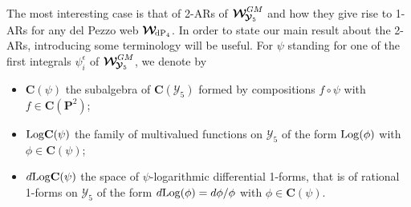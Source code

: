\documentclass[11pt]{amsart}
\newcommand{\sk}{\smallskip}
\begin{document}
The most interesting case is that of 2-ARs of $\boldsymbol{\mathcal W}^{GM}_{ \hspace{-0.05cm}
\boldsymbol{\mathcal Y}_5}$ and how they give rise to 1-ARs for any del Pezzo web 
$\boldsymbol{\mathcal W}_{  \hspace{-0.05cm}{\rm dP}_4}$. 
In order to state our main result about the 2-ARs, introducing some terminology will be useful. For  $\psi$ standing for one of the first integrals  
$\psi_i^\epsilon$ of $ \boldsymbol{\mathcal W}^{GM}_{ \hspace{-0.05cm}
\boldsymbol{\mathcal Y}_5}$, we denote by 
\begin{itemize}
\item 
$\mathbf C(\psi)$ the subalgebra of 
$\mathbf C(\boldsymbol{\mathcal Y}_5)$ formed by compositions $f\circ \psi$ with $f \in\mathbf C( \mathbf P^2)$;\sk
\item ${\rm Log}\mathbf C(\psi)$ the family of multivalued functions on $\boldsymbol{\mathcal Y}_5$ of the form  ${\rm Log}( \phi)$ with $\phi \in \mathbf C( \psi)$;
\sk
\item $d{\rm Log}\mathbf C(\psi)$ the space of $\psi$-logarithmic differential 1-forms, that is of rational 1-forms on 
$\boldsymbol{\mathcal Y}_5$ of the form  $d{\rm Log}( \phi)=
d\phi/ \phi$ with $\phi  \in \mathbf C( \psi)$.
\end{itemize}

\label{Page:tables}
\end{document}
